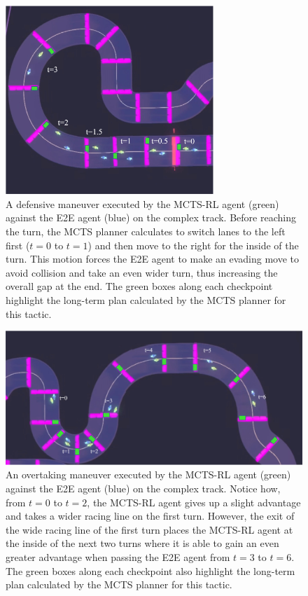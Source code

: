  \begin{figure}
    \centering
  \includegraphics[width=0.7\textwidth]{Figures/MCTSRLDefense.png}
  \caption[Defensive maneuver by MCTS-RL controller.]{A defensive maneuver executed by the MCTS-RL agent (green) against the E2E agent (blue) on the complex track.  Before reaching the turn, the MCTS planner calculates to switch lanes to the left first ($t=0$ to $t=1$) and then move to the right for the inside of the turn. This motion forces the E2E agent to make an evading move to avoid collision and take an even wider turn, thus increasing the overall gap at the end. The green boxes along each checkpoint highlight the long-term plan calculated by the MCTS planner for this tactic.}
  \label{fig:mctsrl:defense}
\end{figure}

 \begin{figure}
  \centering
  \includegraphics[width=\textwidth]{Figures/MCTSRLOvertake.png}
  \caption [Overtaking maneuver by MCTS-RL controller.] {An overtaking maneuver executed by the MCTS-RL agent (green) against the E2E agent (blue) on the complex track. Notice how, from $t=0$ to $t=2$, the MCTS-RL agent gives up a slight advantage and takes a wider racing line on the first turn. However, the exit of the wide racing line of the first turn places the MCTS-RL agent at the inside of the next two turns where it is able to gain an even greater advantage when passing the E2E agent from $t=3$ to $t=6$. The green boxes along each checkpoint also highlight the long-term plan calculated by the MCTS planner for this tactic.}
  \label{fig:mctsrl:overtake}
\end{figure}

